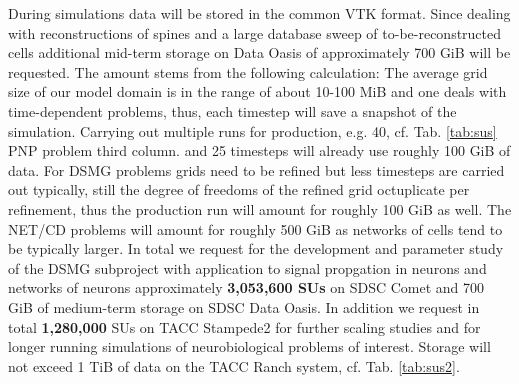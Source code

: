 \begin{table}
\caption{Total number of SUs on TACC Stampede2 for the sub-projects requested}
\label{tab:sus2}
\end{table}

During simulations data will be stored in the common VTK format. Since dealing with
reconstructions of spines and a large database sweep of to-be-reconstructed cells
additional mid-term storage on Data Oasis of approximately 700 GiB will be requested.
The amount stems from the following calculation: The average grid size of our model
domain is in the range of about 10-100 MiB and one deals with time-dependent problems,
thus, each timestep will save a snapshot of the simulation. Carrying out multiple
runs for production, e.g. 40, cf. Tab. \ref{tab:sus} PNP problem third column.
and 25 timesteps will already use roughly 100 GiB of data. For DSMG problems grids 
need to be refined but less timesteps are carried out typically, still the degree of
freedoms of the refined grid octuplicate per refinement, thus the production run 
will amount for roughly 100 GiB as well. The NET/CD problems will amount for roughly 
500 GiB as networks of cells tend to be typically larger. In total we request for the development and parameter 
study of the DSMG subproject with application to signal propgation in neurons and networks of neurons 
approximately \textbf{3,053,600 SUs} on SDSC Comet and 700 GiB of medium-term storage on SDSC Data Oasis.
In addition we request in total \textbf{1,280,000} SUs on TACC Stampede2 for further scaling studies
and for longer running simulations of neurobiological problems of interest. Storage will
not exceed 1 TiB of data on the TACC Ranch system, cf. Tab. \ref{tab:sus2}.
